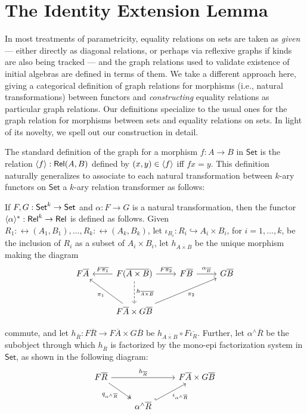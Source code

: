 \documentclass{lmcs}
\theoremstyle{plain}\newtheorem{satz}[thm]{Satz}
\newcommand{\set}{\mathsf{Set}}
\begin{document}
{\section{The Identity Extension Lemma}\label{sec:iel}

In most treatments of parametricity, equality relations on sets are
taken as {\em given} --- either directly as diagonal relations, or
perhaps via reflexive graphs if kinds are also being tracked --- and
the graph relations used to validate existence of initial algebras are
defined in terms of them. We take a different approach here, giving a
categorical definition of graph relations for morphisms (i.e., natural
transformations) between functors and {\em constructing} equality
relations as particular graph relations. Our definitions specialize to
the usual ones for the graph relation for morphisms between sets and
equality relations on sets. In light of its novelty, we spell out
our construction in detail.

The standard definition of the graph for a morphism $f : A \to B$ in
$\set$ is the relation $\langle {f} \rangle : \mathsf{Rel}(A,B)$ defined by $(x,y) \in
\langle {f} \rangle$ iff $fx = y$. This definition naturally generalizes to
associate to each natural transformation between $k$-ary functors on
$\set$ a $k$-ary relation transformer as follows:

\begin{defi}\label{dfn:graph-nat-transf}
If $F, G: \mathsf{Set}^k \to \mathsf{Set}$ and $\alpha : F \to G$ is a natural
transformation, then the functor $\langle {\alpha} \rangle^*: \mathsf{Rel}^k \to \mathsf{Rel}$
is defined as follows. Given $R_1 : \rel(A_1, B_1),...,R_k :
\rel(A_k,B_k)$, let $\iota_{R_i} : R_i \hookrightarrow A_i \times
B_i$, for $i = 1,...,k$, be the inclusion of $R_i$ as a subset of $A_i
\times B_i$,
let $h_{\overline{A \times B}}$ be the unique morphism making the diagram
{\footnotesize\[\begin{tikzcd}[row sep = large]
        F\overline{A}
        &F(\overline{A \times B})
        \ar[l, "{F\overline{\pi_1}}"']
        \ar[r, "{F\overline{\pi_2}}"]
        \ar[d, dashed, "{h_{\overline{A \times B}}}"]
        &F\overline{B}
        \ar[r, "{\alpha_{\ol{B}}}"]
        &G\overline{B} \\
        &F\overline{A} \times G\overline{B}
        \ar[ul, "{\pi_1}"] \ar[urr, "{\pi_2}"']
\end{tikzcd}\]}

\noindent
commute, and let $h_{\overline{R}} : F\overline{R} \to F\overline{A}
\times G\overline{B}$ be $h_{\overline{A \times B}} \circ
F\overline{\iota_R}$. Further, let $\alpha^\wedge\overline{R}$ be the
subobject through which $h_{\overline{R}}$ is factorized by the
mono-epi factorization system in $\set$, as shown in the
following diagram:
{\footnotesize\[\begin{tikzcd}
        F\overline{R}
        \ar[rr, "{h_{\overline{R}}}"]
        \ar[dr, twoheadrightarrow, "{q_{\alpha^\wedge\overline{R}}}"']
        &&F\overline{A} \times G\overline{B} \\
        &\alpha^\wedge\overline{R}
        \ar[ur, hookrightarrow, "{\iota_{\alpha^\wedge\overline{R}}}"']
\end{tikzcd}\]}


\end{defi}}
\end{document}
